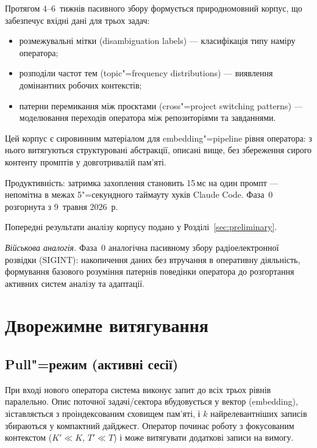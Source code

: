 \documentclass[11pt]{article}
\begin{document}
Протягом 4--6~тижнів пасивного збору формується природномовний корпус, що забезпечує вхідні дані для трьох задач:
\begin{itemize}[nosep]
  \item розмежувальні мітки (disambiguation labels) --- класифікація типу наміру оператора;
  \item розподіли частот тем (topic"=frequency distributions) --- виявлення домінантних робочих контекстів;
  \item патерни перемикання між проєктами (cross"=project switching patterns) --- моделювання переходів оператора між репозиторіями та завданнями.
\end{itemize}

\noindent
Цей корпус є сировинним матеріалом для embedding"=pipeline рівня оператора: з нього витягуються структуровані абстракції, описані вище, без збереження сирого контенту промптів у довготривалій пам'яті.

Продуктивність: затримка захоплення становить 15\,мс на один промпт --- непомітна в межах 5"=секундного таймауту хуків Claude Code.
Фаза~0 розгорнута з 9~травня 2026~р.

Попередні результати аналізу корпусу подано у Розділі~\ref{sec:preliminary}.

\medskip
\noindent\textit{Військова аналогія.}
Фаза~0 аналогічна пасивному збору радіоелектронної розвідки (SIGINT): накопичення даних без втручання в оперативну діяльність, формування базового розуміння патернів поведінки оператора до розгортання активних систем аналізу та адаптації.


\section{Дворежимне витягування}
\label{sec:dual-mode}

\subsection{Pull"=режим (активні сесії)}

При вході нового оператора система виконує запит до всіх трьох рівнів паралельно.
Опис поточної задачі/сектора вбудовується у вектор (embedding), зіставляється з проіндексованим сховищем пам'яті, і $k$ найрелевантніших записів збираються у компактний дайджест.
Оператор починає роботу з фокусованим контекстом ($K' \ll K$, $T' \ll T$) і може витягувати додаткові записи на вимогу.
\end{document}
